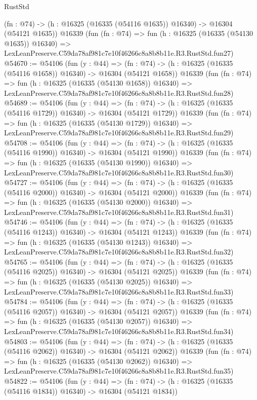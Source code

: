 \begin{lexlean}{RustStd}
\begin{coremodule}
    (fn : @74) -> (h : @16325 (@16335 (@54116 @1635)) @16340) -> @16304 (@54121 @1635))
    @16339
    (fun (fn : @74) =>
    fun (h : @16325 (@16335 (@54130 @1635)) @16340) =>
    LexLeanPreserve.C59da78af981c7e10f46266c8a8b8b11e.R3.RustStd.fun27)
@54670 := @54106
    (fun (y : @44) =>
    (fn : @74) -> (h : @16325 (@16335 (@54116 @1658)) @16340) -> @16304 (@54121 @1658))
    @16339
    (fun (fn : @74) =>
    fun (h : @16325 (@16335 (@54130 @1658)) @16340) =>
    LexLeanPreserve.C59da78af981c7e10f46266c8a8b8b11e.R3.RustStd.fun28)
@54689 := @54106
    (fun (y : @44) =>
    (fn : @74) -> (h : @16325 (@16335 (@54116 @1729)) @16340) -> @16304 (@54121 @1729))
    @16339
    (fun (fn : @74) =>
    fun (h : @16325 (@16335 (@54130 @1729)) @16340) =>
    LexLeanPreserve.C59da78af981c7e10f46266c8a8b8b11e.R3.RustStd.fun29)
@54708 := @54106
    (fun (y : @44) =>
    (fn : @74) -> (h : @16325 (@16335 (@54116 @1990)) @16340) -> @16304 (@54121 @1990))
    @16339
    (fun (fn : @74) =>
    fun (h : @16325 (@16335 (@54130 @1990)) @16340) =>
    LexLeanPreserve.C59da78af981c7e10f46266c8a8b8b11e.R3.RustStd.fun30)
@54727 := @54106
    (fun (y : @44) =>
    (fn : @74) -> (h : @16325 (@16335 (@54116 @2000)) @16340) -> @16304 (@54121 @2000))
    @16339
    (fun (fn : @74) =>
    fun (h : @16325 (@16335 (@54130 @2000)) @16340) =>
    LexLeanPreserve.C59da78af981c7e10f46266c8a8b8b11e.R3.RustStd.fun31)
@54746 := @54106
    (fun (y : @44) =>
    (fn : @74) -> (h : @16325 (@16335 (@54116 @1243)) @16340) -> @16304 (@54121 @1243))
    @16339
    (fun (fn : @74) =>
    fun (h : @16325 (@16335 (@54130 @1243)) @16340) =>
    LexLeanPreserve.C59da78af981c7e10f46266c8a8b8b11e.R3.RustStd.fun32)
@54765 := @54106
    (fun (y : @44) =>
    (fn : @74) -> (h : @16325 (@16335 (@54116 @2025)) @16340) -> @16304 (@54121 @2025))
    @16339
    (fun (fn : @74) =>
    fun (h : @16325 (@16335 (@54130 @2025)) @16340) =>
    LexLeanPreserve.C59da78af981c7e10f46266c8a8b8b11e.R3.RustStd.fun33)
@54784 := @54106
    (fun (y : @44) =>
    (fn : @74) -> (h : @16325 (@16335 (@54116 @2057)) @16340) -> @16304 (@54121 @2057))
    @16339
    (fun (fn : @74) =>
    fun (h : @16325 (@16335 (@54130 @2057)) @16340) =>
    LexLeanPreserve.C59da78af981c7e10f46266c8a8b8b11e.R3.RustStd.fun34)
@54803 := @54106
    (fun (y : @44) =>
    (fn : @74) -> (h : @16325 (@16335 (@54116 @2062)) @16340) -> @16304 (@54121 @2062))
    @16339
    (fun (fn : @74) =>
    fun (h : @16325 (@16335 (@54130 @2062)) @16340) =>
    LexLeanPreserve.C59da78af981c7e10f46266c8a8b8b11e.R3.RustStd.fun35)
@54822 := @54106
    (fun (y : @44) =>
    (fn : @74) -> (h : @16325 (@16335 (@54116 @1834)) @16340) -> @16304 (@54121 @1834))

\end{coremodule}
\end{lexlean}
